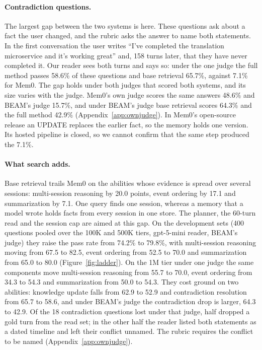 \paragraph{Contradiction questions.} The largest gap between the two systems is here. These questions ask about a fact the user changed, and the rubric asks the answer to name both statements. In the first conversation the user writes ``I've completed the translation microservice and it's working great'' and, 158 turns later, that they have never completed it. Our reader sees both turns and says so: under the one judge the full method passes 58.6\% of these questions and base retrieval 65.7\%, against 7.1\% for Mem0. The gap holds under both judges that scored both systems, and its size varies with the judge. Mem0's own judge scores the same answers 48.6\% and BEAM's judge 15.7\%, and under BEAM's judge base retrieval scores 64.3\% and the full method 42.9\% (Appendix~\ref{app:ownjudge}). In Mem0's open-source release an UPDATE replaces the earlier fact, so the memory holds one version. Its hosted pipeline is closed, so we cannot confirm that the same step produced the 7.1\%.

\paragraph{What search adds.} Base retrieval trails Mem0 on the abilities whose evidence is spread over several sessions: multi-session reasoning by 20.0 points, event ordering by 17.1 and summarization by 7.1. One query finds one session, whereas a memory that a model wrote holds facts from every session in one store. The planner, the 60-turn read and the session cap are aimed at this gap. On the development sets (400 questions pooled over the 100K and 500K tiers, gpt-5-mini reader, BEAM's judge) they raise the pass rate from 74.2\% to 79.8\%, with multi-session reasoning moving from 67.5 to 82.5, event ordering from 52.5 to 70.0 and summarization from 65.0 to 80.0 (Figure~\ref{fig:ladder}). On the 1M tier under one judge the same components move multi-session reasoning from 55.7 to 70.0, event ordering from 34.3 to 54.3 and summarization from 50.0 to 54.3. They cost ground on two abilities: knowledge update falls from 62.9 to 52.9 and contradiction resolution from 65.7 to 58.6, and under BEAM's judge the contradiction drop is larger, 64.3 to 42.9. Of the 18 contradiction questions lost under that judge, half dropped a gold turn from the read set; in the other half the reader listed both statements as a dated timeline and left their conflict unnamed. The rubric requires the conflict to be named (Appendix~\ref{app:ownjudge}).

